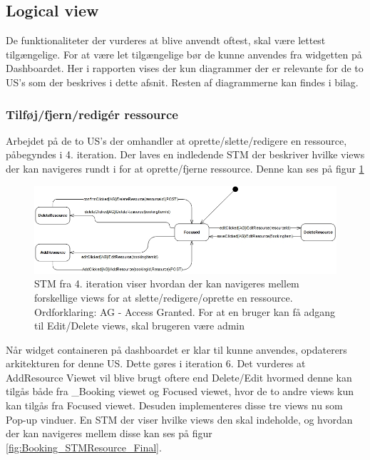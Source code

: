 \subsection{Logical view}
De funktionaliteter der vurderes at blive anvendt oftest, skal være lettest tilgængelige. For at være let tilgængelige bør de kunne anvendes fra widgetten på Dashboardet. Her i rapporten vises der kun diagrammer der er relevante for de to US's som der beskrives i dette afsnit. Resten af diagrammerne kan findes i bilag.

\subsubsection{Tilføj/fjern/redigér ressource}
Arbejdet på de to US's der omhandler at oprette/slette/redigere en ressource, påbegyndes i 4. iteration. Der laves en indledende STM der beskriver hvilke views der kan navigeres rundt i for at oprette/fjerne ressource. Denne kan ses på figur \ref{fig:Booking_STMResource_Initial}
 
\begin{figure}[H]
  \includegraphics[width=1.0\linewidth]{01_Billeder/09_Arkitektur/STM_AddResource_Initial.jpg}
  \caption{STM fra 4. iteration viser hvordan der kan navigeres mellem forskellige views for at slette/redigere/oprette en ressource. Ordforklaring: AG - Access Granted. For at en bruger kan få adgang til Edit/Delete views, skal brugeren være admin}
  \label{fig:Booking_STMResource_Initial}
\end{figure}

Når widget containeren på dashboardet er klar til kunne anvendes, opdaterers arkitekturen for denne US. Dette gøres i iteration 6. Det vurderes at AddResource Viewet vil blive brugt oftere end Delete/Edit hvormed denne kan tilgås både fra \_Booking viewet og Focused viewet, hvor de to andre views kun kan tilgås fra Focused viewet. Desuden implementeres disse tre views nu som Pop-up vinduer. En STM der viser hvilke views den skal indeholde, og hvordan der kan navigeres mellem disse kan ses på figur \ref{fig:Booking_STMResource_Final}.  


